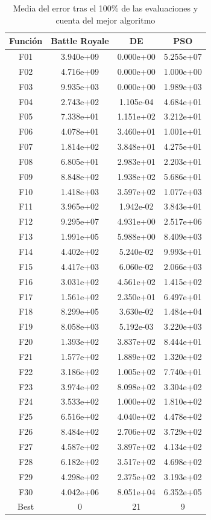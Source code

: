 \documentclass[11pt]{article}
\begin{document}
\begin{table}[H]
\centering
\begin{tabular}{|c|c|c|c|}
\hline
\textbf{Función} & \textbf{Battle Royale} &         \textbf{DE} &        \textbf{PSO} \\
\hline
F01  &     3.940e+09 &  0.000e+00 &  5.255e+07 \\
F02  &     4.716e+09 &  0.000e+00 &  1.000e+00 \\
F03  &     9.935e+03 &  0.000e+00 &  1.989e+03 \\
F04  &     2.743e+02 &  1.105e-04 &  4.684e+01 \\
F05  &     7.338e+01 &  1.151e+02 &  3.212e+01 \\
F06  &     4.078e+01 &  3.460e+01 &  1.001e+01 \\
F07  &     1.814e+02 &  3.848e+01 &  4.275e+01 \\
F08  &     6.805e+01 &  2.983e+01 &  2.203e+01 \\
F09  &     8.848e+02 &  1.938e+02 &  5.686e+01 \\
F10  &     1.418e+03 &  3.597e+02 &  1.077e+03 \\
F11  &     3.965e+02 &  1.942e-02 &  3.843e+01 \\
F12  &     9.295e+07 &  4.931e+00 &  2.517e+06 \\
F13  &     1.991e+05 &  5.988e+00 &  8.409e+03 \\
F14  &     4.402e+02 &  5.240e-02 &  9.993e+01 \\
F15  &     4.417e+03 &  6.060e-02 &  2.066e+03 \\
F16  &     3.031e+02 &  4.561e+02 &  1.415e+02 \\
F17  &     1.561e+02 &  2.350e+01 &  6.497e+01 \\
F18  &     8.299e+05 &  3.630e-02 &  1.484e+04 \\
F19  &     8.058e+03 &  5.192e-03 &  3.220e+03 \\
F20  &     1.393e+02 &  3.837e+02 &  8.444e+01 \\
F21  &     1.577e+02 &  1.889e+02 &  1.320e+02 \\
F22  &     3.186e+02 &  1.005e+02 &  7.740e+01 \\
F23  &     3.974e+02 &  8.098e+02 &  3.304e+02 \\
F24  &     3.533e+02 &  1.000e+02 &  1.810e+02 \\
F25  &     6.516e+02 &  4.040e+02 &  4.478e+02 \\
F26  &     8.484e+02 &  2.706e+02 &  3.729e+02 \\
F27  &     4.587e+02 &  3.897e+02 &  4.134e+02 \\
F28  &     6.182e+02 &  3.517e+02 &  4.698e+02 \\
F29  &     4.298e+02 &  2.375e+02 &  3.193e+02 \\
F30  &     4.042e+06 &  8.051e+04 &  6.352e+05 \\
Best &             0 &         21 &          9 \\
\hline
\end{tabular}
    \caption{Media del error tras el 100\% de las evaluaciones y cuenta del mejor algoritmo}
\end{table}
\end{document}
